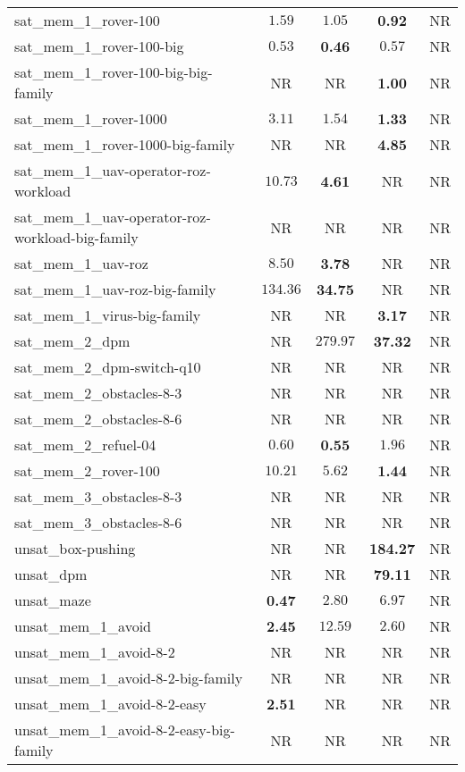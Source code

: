 \begin{tabular}{lcccc}
sat\_mem\_1\_rover-100 & $1.59$ & $1.05$ & \textbf{0.92} & NR \\
sat\_mem\_1\_rover-100-big & $0.53$ & \textbf{0.46} & $0.57$ & NR \\
sat\_mem\_1\_rover-100-big-big-family & NR & NR & \textbf{1.00} & NR \\
sat\_mem\_1\_rover-1000 & $3.11$ & $1.54$ & \textbf{1.33} & NR \\
sat\_mem\_1\_rover-1000-big-family & NR & NR & \textbf{4.85} & NR \\
sat\_mem\_1\_uav-operator-roz-workload & $10.73$ & \textbf{4.61} & NR & NR \\
sat\_mem\_1\_uav-operator-roz-workload-big-family & NR & NR & NR & NR \\
sat\_mem\_1\_uav-roz & $8.50$ & \textbf{3.78} & NR & NR \\
sat\_mem\_1\_uav-roz-big-family & $134.36$ & \textbf{34.75} & NR & NR \\
sat\_mem\_1\_virus-big-family & NR & NR & \textbf{3.17} & NR \\
sat\_mem\_2\_dpm & NR & $279.97$ & \textbf{37.32} & NR \\
sat\_mem\_2\_dpm-switch-q10 & NR & NR & NR & NR \\
sat\_mem\_2\_obstacles-8-3 & NR & NR & NR & NR \\
sat\_mem\_2\_obstacles-8-6 & NR & NR & NR & NR \\
sat\_mem\_2\_refuel-04 & $0.60$ & \textbf{0.55} & $1.96$ & NR \\
sat\_mem\_2\_rover-100 & $10.21$ & $5.62$ & \textbf{1.44} & NR \\
sat\_mem\_3\_obstacles-8-3 & NR & NR & NR & NR \\
sat\_mem\_3\_obstacles-8-6 & NR & NR & NR & NR \\
unsat\_box-pushing & NR & NR & \textbf{184.27} & NR \\
unsat\_dpm & NR & NR & \textbf{79.11} & NR \\
unsat\_maze & \textbf{0.47} & $2.80$ & $6.97$ & NR \\
unsat\_mem\_1\_avoid & \textbf{2.45} & $12.59$ & $2.60$ & NR \\
unsat\_mem\_1\_avoid-8-2 & NR & NR & NR & NR \\
unsat\_mem\_1\_avoid-8-2-big-family & NR & NR & NR & NR \\
unsat\_mem\_1\_avoid-8-2-easy & \textbf{2.51} & NR & NR & NR \\
unsat\_mem\_1\_avoid-8-2-easy-big-family & NR & NR & NR & NR \\

\end{tabular}
